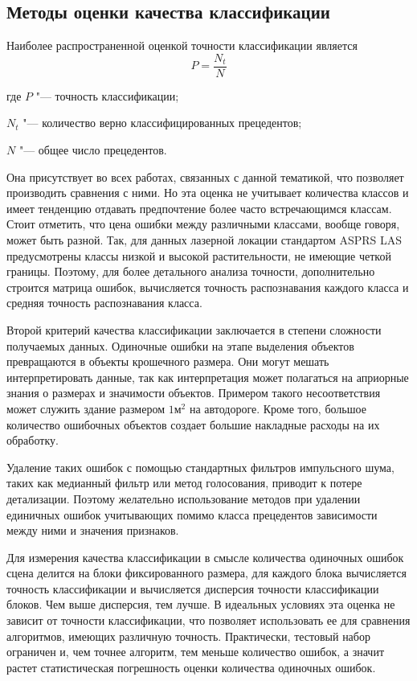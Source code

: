 \subsection{Методы оценки качества классификации}
Наиболее распространенной оценкой точности классификации является
$$
P=\frac{N_t}{N}
$$
\begin{ESKDexplanation}
\item[где ] $P$ "--- точность классификации;
\item $N_t$ "--- количество верно классифицированных прецедентов;
\item $N$ "--- общее число прецедентов.
\end{ESKDexplanation}
Она присутствует во всех работах, связанных с данной тематикой, что позволяет производить сравнения с ними. Но эта оценка не учитывает количества классов и имеет тенденцию отдавать предпочтение более часто встречающимся классам. Стоит отметить, что цена ошибки между различными классами, вообще говоря, может быть разной. Так, для данных лазерной локации стандартом ASPRS LAS предусмотрены классы низкой и высокой растительности, не имеющие четкой границы. Поэтому, для более детального анализа точности, дополнительно строится матрица ошибок, вычисляется точность распознавания каждого класса и средняя точность распознавания класса.

Второй критерий качества классификации заключается в степени сложности получаемых данных. Одиночные ошибки на этапе выделения объектов превращаются в объекты крошечного размера. Они могут мешать интерпретировать данные, так как интерпретация может полагаться на априорные знания о размерах и значимости объектов. Примером такого несоответствия может служить здание размером $1\mbox{м}^2$ на автодороге. Кроме того, большое количество ошибочных объектов создает большие накладные расходы на их обработку.

Удаление таких ошибок с помощью стандартных фильтров импульсного шума, таких как медианный фильтр или метод голосования, приводит к потере детализации. Поэтому желательно использование методов при удалении единичных ошибок учитывающих помимо класса прецедентов зависимости между ними и значения признаков.

Для измерения качества классификации в смысле количества одиночных ошибок сцена делится на блоки фиксированного размера, для каждого блока вычисляется точность классификации и вычисляется дисперсия точности классификации блоков. Чем выше дисперсия, тем лучше. В идеальных условиях эта оценка не зависит от точности классификации, что позволяет использовать ее для сравнения алгоритмов, имеющих различную точность. Практически, тестовый набор ограничен и, чем точнее алгоритм, тем меньше количество ошибок, а значит растет статистическая погрешность оценки количества одиночных ошибок.

